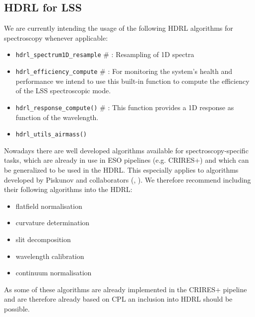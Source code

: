 

\subsection{HDRL for LSS}\label{ssec:hdrllss}
We are currently intending the usage of the following \ac{HDRL} algorithms for spectroscopy whenever applicable:

\begin{itemize}
    \item \texttt{hdrl\_spectrum1D\_resample}       # : Resampling of 1D spectra
    \item \texttt{hdrl\_efficiency\_compute}        # : For monitoring the system's health and performance we intend to use this built-in function to compute the efficiency of the \ac{LSS} spectroscopic mode.
    \item \texttt{hdrl\_response\_compute()}        # : This function provides a 1D response as function of the wavelength.
    \item \texttt{hdrl\_utils\_airmass()}
\end{itemize}

Nowadays there are well developed algorithms available for spectroscopy-specific tasks, which are already in use in ESO pipelines (e.g. CRIRES+) and which can be generalized to be used in the \ac{HDRL}.
This especially applies to algorithms developed by Piskunov and collaborators (\cite{pis21}, \cite{pis02}).
We therefore recommend including their following algorithms into the \ac{HDRL}:

\begin{itemize}
    \item flatfield normalisation
    \item curvature determination
    \item slit decomposition
    \item wavelength calibration
    \item continuum normalisation
\end{itemize}

As some of these algorithms are already implemented in the \ac{CRIRES}+ pipeline
and are therefore already based on \ac{CPL} an inclusion into \ac{HDRL} should
be possible.

